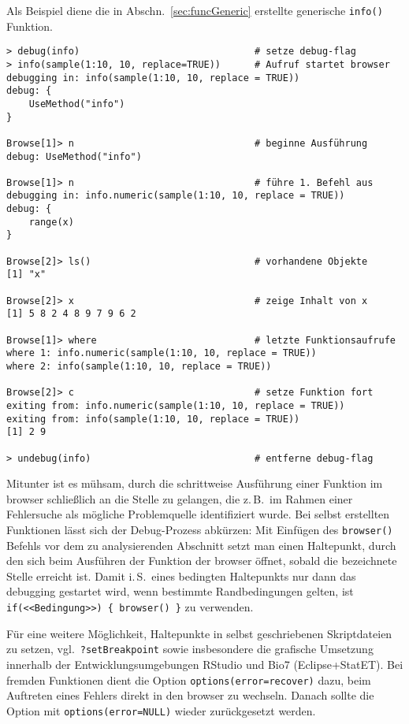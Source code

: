 Als Beispiel diene die in Abschn.\ \ref{sec:funcGeneric} erstellte generische \lstinline!info()! Funktion.
\begin{lstlisting}
> debug(info)                               # setze debug-flag
> info(sample(1:10, 10, replace=TRUE))      # Aufruf startet browser
debugging in: info(sample(1:10, 10, replace = TRUE))
debug: {
    UseMethod("info")
}

Browse[1]> n                                # beginne Ausführung
debug: UseMethod("info")

Browse[1]> n                                # führe 1. Befehl aus
debugging in: info.numeric(sample(1:10, 10, replace = TRUE))
debug: {
    range(x)
}

Browse[2]> ls()                             # vorhandene Objekte
[1] "x"

Browse[2]> x                                # zeige Inhalt von x
[1] 5 8 2 4 8 9 7 9 6 2

Browse[1]> where                            # letzte Funktionsaufrufe
where 1: info.numeric(sample(1:10, 10, replace = TRUE))
where 2: info(sample(1:10, 10, replace = TRUE))

Browse[2]> c                                # setze Funktion fort
exiting from: info.numeric(sample(1:10, 10, replace = TRUE))
exiting from: info(sample(1:10, 10, replace = TRUE))
[1] 2 9

> undebug(info)                             # entferne debug-flag
\end{lstlisting}

Mitunter ist es mühsam, durch die schrittweise Ausführung einer Funktion im browser schließlich an die Stelle zu gelangen, die z.\,B.\ im Rahmen einer Fehlersuche als mögliche Problemquelle identifiziert wurde. Bei selbst erstellten Funktionen lässt sich der Debug-Prozess abkürzen: Mit Einfügen des  \lstinline!browser()! Befehls vor dem zu analysierenden Abschnitt setzt man einen Haltepunkt, durch den sich beim Ausführen der Funktion der browser öffnet, sobald die bezeichnete Stelle erreicht ist. Damit i.\,S.\ eines bedingten Haltepunkts nur dann das debugging gestartet wird, wenn bestimmte Randbedingungen gelten, ist \lstinline!if(<<Bedingung>>) { browser() }! zu verwenden.

Für eine weitere Möglichkeit, Haltepunkte in selbst geschriebenen Skriptdateien zu setzen, vgl.\ \lstinline!?setBreakpoint! sowie insbesondere die grafische Umsetzung innerhalb der Entwicklungsumgebungen R{}Studio und Bio7 (Eclipse+StatET). Bei fremden Funktionen dient die Option \lstinline!options(error=recover)! dazu, beim Auftreten eines Fehlers direkt in den browser zu wechseln. Danach sollte die Option mit \lstinline!options(error=NULL)! wieder zurückgesetzt werden.


